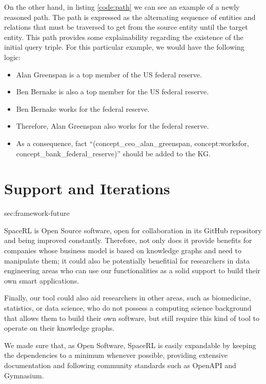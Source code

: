 On the other hand, in listing \ref{code:path} we can see an example of a newly reasoned path. The path is expressed as the alternating sequence of entities and relations that must be traversed to get from the source entity until the target entity. This path provides some explainability regarding the existence of the initial query triple. For this particular example, we would have the following logic:

\begin{itemize}
    \item Alan Greenspan is a top member of the US federal reserve.
    \item Ben Bernake is also a top member for the US federal reserve.
    \item Ben Bernake works for the federal reserve.
    \item Therefore, Alan Greenspan also works for the federal reserve.
    \item As a consequence, fact ``(concept\_ceo\_alan\_greenspan, concept:worksfor,\\  concept\_bank\_federal\_reserve)'' should be added to the KG.
\end{itemize}

\section{Support and Iterations}{sec:framework-future}

SpaceRL is Open Source software, open for collaboration in its GitHub repository \cite{SpaceRL} and being improved constantly. Therefore, not only does it provide benefits for companies whose business model is based on knowledge graphs and need to manipulate them; it could also be potentially benefitial for researchers in data engineering areas who can use our functionalities as a solid support to build their own smart applications.

Finally, our tool could also aid researchers in other areas, such as biomedicine, statistics, or data science, who do not possess a computing science background that allows them to build their own software, but still require this kind of tool to operate on their knowledge graphs.


We made sure that, as Open Software, SpaceRL is easily expandable by keeping the dependencies to a minimum whenever possible, providing extensive documentation and following community standards such as OpenAPI and Gymnasium.

